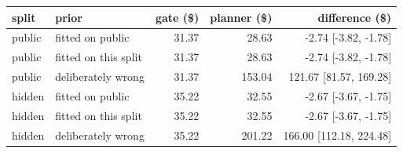 \begin{tabular}{llrrr}
\toprule
split & prior & gate (\$) & planner (\$) & difference (\$) \\
\midrule
public & fitted on public & 31.37 & 28.63 & -2.74 [-3.82, -1.78] \\
public & fitted on this split & 31.37 & 28.63 & -2.74 [-3.82, -1.78] \\
public & deliberately wrong & 31.37 & 153.04 & 121.67 [81.57, 169.28] \\
hidden & fitted on public & 35.22 & 32.55 & -2.67 [-3.67, -1.75] \\
hidden & fitted on this split & 35.22 & 32.55 & -2.67 [-3.67, -1.75] \\
hidden & deliberately wrong & 35.22 & 201.22 & 166.00 [112.18, 224.48] \\
\bottomrule
\end{tabular}